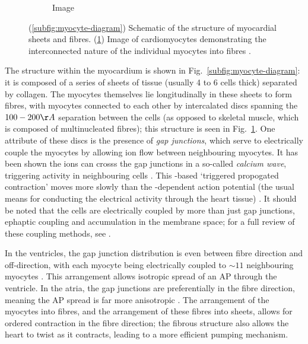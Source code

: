 \documentclass[../thesis-main.tex]{subfiles}
\begin{document}
\begin{figure}
\begin{subfigure}[b]{0.45\textwidth}
   \caption{Image}
   \label{subfig:myocyte-image}
  \end{subfigure}
  \caption[Structure of myocardial sheets and fibres]{(\ref{subfig:myocyte-diagram}) Schematic of the structure of myocardial sheets and fibres. (\ref{subfig:myocyte-image}) Image of cardiomyocytes demonstrating the interconnected nature of the individual myocytes into fibres \citep{Girod2006}.}
  \label{fig:myocyte-structure}
 \end{figure}
 
 The structure within the myocardium is shown in Fig.~\ref{subfig:myocyte-diagram}: it is composed of a series of sheets of tissue (usually 4 to 6 cells thick) separated by collagen. The myocytes themselves lie longitudinally in these sheets to form fibres, with myocytes connected to each other by intercalated discs spanning the $100-200\AA$ separation between the cells (as opposed to skeletal muscle, which is composed of multinucleated fibres); this structure is seen in Fig.~\ref{subfig:myocyte-image}. One attribute of these discs is the presence of \emph{gap junctions}, which serve to electrically couple the myocytes by allowing ion flow between neighbouring myocytes. It has been shown the \ca{} ions can crosss the gap junctions in a so-called \emph{calcium wave}, triggering activity in neighbouring cells \citep{Miura1998}. This \ca{}-based `triggered propogated contraction' moves more slowly than the \na{}-dependent action potential (the usual means for conducting the electrical activity through the heart tissue) \citep{Clusin2003}. It should be noted that the cells are electrically coupled by more than just gap junctions, \eg{} ephaptic coupling and \K{} accumulation in the membrane space; for a full review of these coupling methods, see \citet{Sperelakis2002}.
 
 In the ventricles, the gap junction distribution is even between fibre direction and off-direction, with each myocyte being electrically coupled to $\sim11$ neighbouring myocytes \citep{Smaill2013}. This arrangement allows isotropic spread of an AP through the ventricle. In the atria, the gap junctions are preferentially in the fibre direction, meaning the AP spread is far more anisotropic \citep{Saffitz1994}. The arrangement of the myocytes into fibres, and the arrangement of these fibres into sheets, allows for ordered contraction in the fibre direction; the fibrous structure also allows the heart to twist as it contracts, leading to a more efficient pumping mechanism.
 
\end{document}
